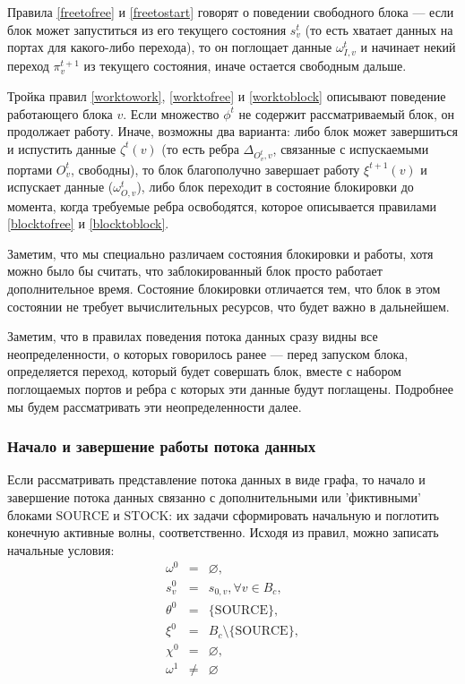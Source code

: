 \documentclass[10pt,a4paper]{article}
\newcommand{\stock}{\text{STOCK}}
\newcommand{\source}{\text{SOURCE}}
\begin{document}
Правила \eqref{freetofree} и \eqref{freetostart} говорят о поведении свободного блока --- если блок может запуститься из его текущего состояния $s^t_v$
(то есть хватает данных на портах для какого-либо перехода), то он поглощает данные $\omega^t_{I, v}$ и
начинает некий переход $\pi^{t+1}_v$ из текущего состояния, иначе остается свободным дальше.

Тройка правил \eqref{worktowork}, \eqref{worktofree} и \eqref{worktoblock} описывают поведение работающего блока $v$. Если множество $\phi^t$ не содержит рассматриваемый блок,
он продолжает работу. Иначе, возможны два варианта: либо блок может завершиться и испустить данные $\zeta^t(v)$ (то есть ребра $\Delta_{O^t_v, v}$, связанные с
испускаемыми портами $O^t_v$, свободны), то блок благополучно завершает работу $\xi^{t + 1}(v)$ и испускает данные ($\omega^t_{O, v}$),
либо блок переходит в состояние блокировки до момента, когда требуемые ребра освободятся, которое описывается правилами \eqref{blocktofree} и \eqref{blocktoblock}.

Заметим, что мы специально различаем состояния блокировки и работы, хотя можно было бы считать, что заблокированный блок просто работает дополнительное время.
Состояние блокировки отличается тем, что блок в этом состоянии не требует вычислительных ресурсов, что будет важно в дальнейшем.

Заметим, что в правилах поведения потока данных сразу видны все неопределенности, о которых говорилось ранее --- перед запуском блока, определяется переход,
который будет совершать блок, вместе с набором поглощаемых портов и ребра с которых эти данные будут поглащены. Подробнее мы будем рассматривать эти неопределенности далее.

\subsubsection{Начало и завершение работы потока данных}
  Если рассматривать представление потока данных в виде графа, то начало и завершение потока данных связанно с дополнительными или 'фиктивными'
  блоками $\source$ и $\stock$: их задачи сформировать начальную и поглотить конечную активные волны, соответственно.
  Исходя из правил, можно записать начальные условия:
  \begin{eqnarray}
    \omega^0 & = & \varnothing, \\
    s^0_v & = & s_{0, v}, \forall v \in B_c, \\
    \theta^0 & = & \{\source\}, \\
    \xi^0 & = & B_c \setminus \{\source\}, \\
    \chi^0 & = & \varnothing, \\
    \omega^1 & \neq & \varnothing
  \end{eqnarray}
  
\end{document}
